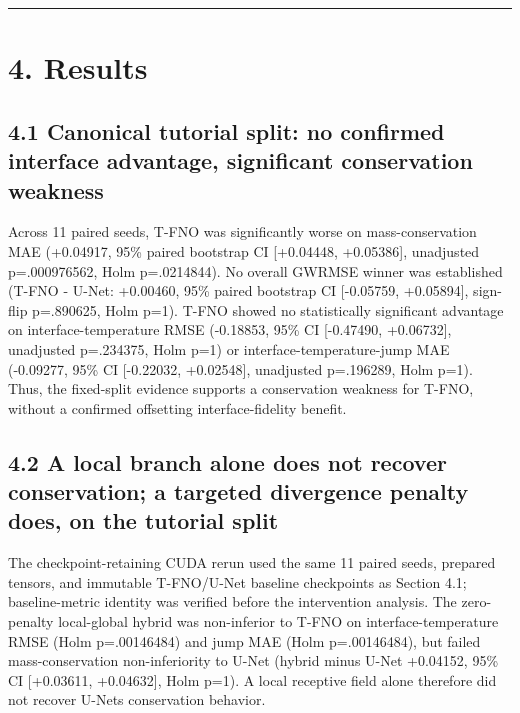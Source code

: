 \documentclass[preprint,12pt]{elsarticle}
\begin{document}
\begin{center}\rule{0.5\linewidth}{0.5pt}\end{center}

\section*{4. Results}\label{4-results}

\subsection*{4.1 Canonical tutorial split: no confirmed interface
advantage, significant conservation
weakness}\label{41-canonical-tutorial-split-no-confirmed-interface-advantage-significant-conservation-weakness}

Across 11 paired seeds, T-FNO was significantly worse on
mass-conservation MAE (+0.04917, 95\% paired bootstrap CI {[}+0.04448,
+0.05386{]}, unadjusted p=.000976562, Holm p=.0214844). No overall
GWRMSE winner was established (T-FNO - U-Net: +0.00460, 95\% paired
bootstrap CI {[}-0.05759, +0.05894{]}, sign-flip p=.890625, Holm p=1).
T-FNO showed no statistically significant advantage on
interface-temperature RMSE (-0.18853, 95\% CI {[}-0.47490, +0.06732{]},
unadjusted p=.234375, Holm p=1) or interface-temperature-jump MAE
(-0.09277, 95\% CI {[}-0.22032, +0.02548{]}, unadjusted p=.196289, Holm
p=1). Thus, the fixed-split evidence supports a conservation weakness
for T-FNO, without a confirmed offsetting interface-fidelity benefit.

\subsection*{4.2 A local branch alone does not recover conservation; a
targeted divergence penalty does, on the tutorial
split}\label{42-a-local-branch-alone-does-not-recover-conservation-a-targeted-divergence-penalty-does-on-the-tutorial-split}

The checkpoint-retaining CUDA rerun used the same 11 paired seeds,
prepared tensors, and immutable T-FNO/U-Net baseline checkpoints as
Section 4.1; baseline-metric identity was verified before the
intervention analysis. The zero-penalty local-global hybrid was
non-inferior to T-FNO on interface-temperature RMSE (Holm p=.00146484)
and jump MAE (Holm p=.00146484), but failed mass-conservation
non-inferiority to U-Net (hybrid minus U-Net +0.04152, 95\% CI
{[}+0.03611, +0.04632{]}, Holm p=1). A local receptive field alone
therefore did not recover U-Net\textquotesingle s conservation behavior.
\end{document}
